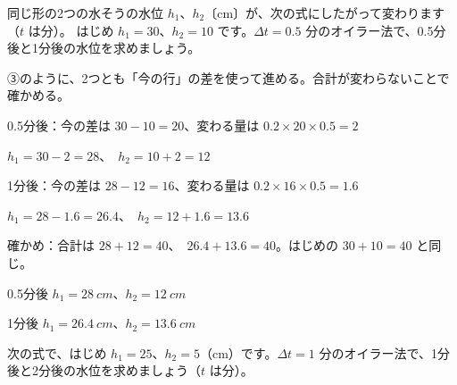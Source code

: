 
\begin{reidai}
同じ形の2つの水そうの水位 $h_1$、$h_2$〔cm〕が、次の式にしたがって変わります（$t$ は分）。
はじめ $h_1=30$、$h_2=10$ です。$\Delta t=0.5$ 分のオイラー法で、0.5分後と1分後の水位を求めましょう。\par
\kangaekata ③のように、2つとも「今の行」の差を使って進める。合計が変わらないことで確かめる。\par
\shiki\kvios{}\zw{} 0.5分後：今の差は $30-10=20$、変わる量は $0.2\times20\times0.5=2$\par
\kviob $h_1=30-2=28$、\ $h_2=10+2=12$\par
\kvioa 1分後：今の差は $28-12=16$、変わる量は $0.2\times16\times0.5=1.6$\par
\kviob $h_1=28-1.6=26.4$、\ $h_2=12+1.6=13.6$\par
\kvioa 確かめ：合計は $28+12=40$、\ $26.4+13.6=40$。はじめの $30+10=40$ と同じ。\par
\kotae\kvios{}\zw{} 0.5分後 $h_1=\qty{28}{cm}$、$h_2=\qty{12}{cm}$\par
\kvioa 1分後 $h_1=\qty{26.4}{cm}$、$h_2=\qty{13.6}{cm}$
\end{reidai}

\begin{jibun}
次の式で、はじめ $h_1=25$、$h_2=5$（cm）です。$\Delta t=1$ 分のオイラー法で、1分後と2分後の水位を求めましょう（$t$ は分）。
\end{jibun}

